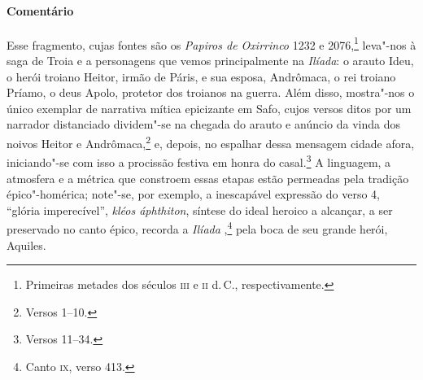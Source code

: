 \medskip

\paragraph{Comentário} Esse fragmento, cujas fontes são os \emph{Papiros de Oxirrinco} 1232 e 2076,\footnote{Primeiras metades dos séculos \textsc{iii} e \textsc{ii} d.\,C., respectivamente.} leva"-nos à saga
de Troia e a personagens que vemos principalmente na \emph{Ilíada}: o arauto
Ideu, o herói troiano Heitor, irmão de Páris, e sua esposa, Andrômaca, o rei
troiano Príamo, o deus Apolo, protetor dos troianos na guerra. Além disso,
mostra"-nos o único exemplar de narrativa mítica epicizante
em Safo, cujos versos ditos por um narrador distanciado dividem"-se na
chegada do arauto e anúncio da vinda dos noivos Heitor e Andrômaca,\footnote{Versos
1--10.} e, depois, no espalhar dessa mensagem cidade afora, iniciando"-se com
isso a procissão festiva em honra do casal.\footnote{Versos 11--34.} A linguagem, a
atmosfera e a métrica que constroem essas etapas estão permeadas pela tradição
épico"-homérica; note"-se, por exemplo, a inescapável expressão do verso 4,
``glória imperecível'', \emph{kléos áphthiton}, síntese do ideal heroico a alcançar, a
ser preservado no canto épico, recorda a \emph{Ilíada },\footnote{Canto \textsc{ix}, verso 413.} 
pela boca de seu grande herói, Aquiles.


